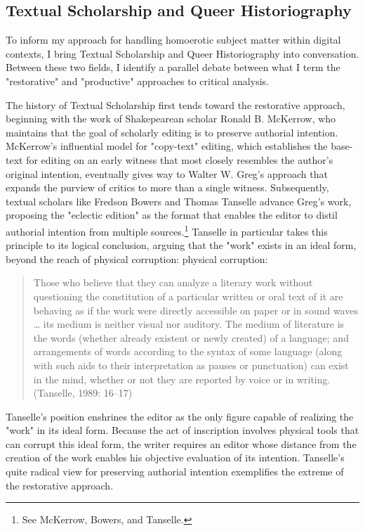 \documentclass[11pt]{article}
\begin{document}
\subsection{Textual Scholarship and Queer Historiography}
\label{sec:org7e36f86}
To inform my approach for handling homoerotic subject matter within
digital contexts, I bring Textual Scholarship and Queer Historiography
into conversation. Between these two fields, I identify a parallel
debate between what I term the "restorative" and "productive"
approaches to critical analysis.

The history of Textual Scholarship first tends toward the restorative
approach, beginning with the work of Shakepearean scholar Ronald
B. McKerrow, who maintains that the goal of scholarly editing is to
preserve authorial intention. McKerrow's influential model for
"copy-text" editing, which establishes the base-text for editing on an
early witness that most closely resembles the author's original
intention, eventually gives way to Walter W. Greg's approach that
expands the purview of critics to more than a single
witness. Subsequently, textual scholars like Fredson Bowers and Thomas
Tanselle advance Greg's work, proposing the "eclectic edition" as the
format that enables the editor to distil authorial intention from
multiple sources.\footnote{See McKerrow, Bowers, and Tanselle.} Tanselle in particular takes this principle to
its logical conclusion, arguing that the "work" exists in an ideal
form, beyond the reach of physical corruption:
physical corruption: 
\begin{quote}
Those who believe that they can analyze a literary work without
questioning the constitution of a particular written or oral text of it
are behaving as if the work were directly accessible on paper or in
sound waves \ldots{} its medium is neither visual nor auditory. The medium of
literature is the words (whether already existent or newly created) of a
language; and arrangements of words according to the syntax of some
language (along with such aids to their interpretation as pauses or
punctuation) can exist in the mind, whether or not they are reported by
voice or in writing. (Tanselle, 1989: 16--17)
\end{quote}
Tanselle's position enshrines the editor as the only figure capable of
realizing the "work" in its ideal form. Because the act of inscription
involves physical tools that can corrupt this ideal form, the writer
requires an editor whose distance from the creation of the work
enables his objective evaluation of its intention. Tanselle's quite
radical view for preserving authorial intention exemplifies the
extreme of the restorative approach.
\end{document}
